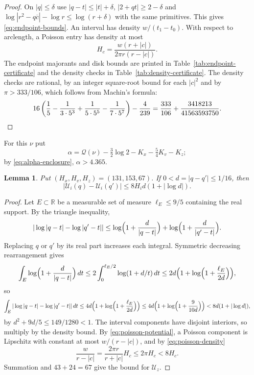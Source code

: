 \documentclass{amsart}
\newtheorem{lemma}{Lemma}[section]
\numberwithin{equation}{section}
\numberwithin{table}{section}
\begin{document}
\begin{proof}
On $|q|\le\delta$ use $|q-t|\le|t|+\delta$, $|2+qt|\ge2-\delta$ and
$\log|r^2-q\overline c|-\log r\le\log(r+\delta)$ with the same primitives.
This gives \eqref{eq:endpoint-bounds}. An interval has density
$w/(t_1-t_0)$. With respect to arclength, a Poisson entry has density at
most
\begin{equation}\label{eq:poisson-density}
H_c=\frac{w(r+|c|)}{2\pi r(r-|c|)}.
\end{equation}
The endpoint majorants and disk bounds are printed in
Table~\ref{tab:endpoint-certificate} and the density checks in
Table~\ref{tab:density-certificate}. The density checks are rational, by an integer square-root bound for
each $|c|^2$ and by $\pi>333/106$, which follows from Machin's formula:
\[
 16\left(\frac15-\frac1{3\cdot5^3}
       +\frac1{5\cdot5^5}-\frac1{7\cdot5^7}\right)-\frac4{239}
 =\frac{333}{106}+\frac{3418213}{41563593750}.\qedhere
\]
\end{proof}

For this $\nu$ put
\[
 \alpha=\mathcal Q(\nu)-\tfrac32\log2-K_x-\tfrac54K_v-K_z;
\]
by \eqref{eq:alpha-enclosure}, $\alpha>4.365$.

\begin{lemma}\label{lem:potential-modulus}
Put $(H_x,H_v,H_z)=(131,153,67)$. If $0<d=|q-q'|\le1/16$, then
\begin{equation*}
 |\mathcal U_i(q)-\mathcal U_i(q')|\le8H_i d(1+|\log d|).
\end{equation*}
\end{lemma}
\begin{proof}
Let $E\subset\mathbb R$ be a measurable set of measure $\ell_E\le9/5$ containing
the real support. By the triangle inequality,
\[
 |\log|q-t|-\log|q'-t||
 \le\log\Bigl(1+\frac d{|q-t|}\Bigr)
      +\log\Bigl(1+\frac d{|q'-t|}\Bigr).
\]
Replacing $q$ or $q'$ by its real part increases each integral. Symmetric
decreasing rearrangement gives
\[
 \int_E\log\Bigl(1+\frac d{|q-t|}\Bigr)\,dt
 \le2\int_0^{\ell_E/2}\log(1+d/t)\,dt
 \le2d\Bigl(1+\log\Bigl(1+\frac{\ell_E}{2d}\Bigr)\Bigr),
\]
so
\[
 \int_E|\log|q-t|-\log|q'-t||\,dt
 \le4d\Bigl(1+\log\Bigl(1+\frac{\ell_E}{2d}\Bigr)\Bigr)
 \le4d\Bigl(1+\log\Bigl(1+\frac9{10d}\Bigr)\Bigr)
 <8d(1+|\log d|),
\]
by $d^2+9d/5\le149/1280<1$. The interval components have disjoint
interiors, so multiply by the density bound. By
\eqref{eq:poisson-potential}, a Poisson component is Lipschitz with
constant at most $w/(r-|c|)$, and by \eqref{eq:poisson-density}
\[
 \frac{w}{r-|c|}=\frac{2\pi r}{r+|c|}H_c\le2\pi H_c<8H_c.
\]
Summation and $43+24=67$ give the bound for $\mathcal U_z$.
\end{proof}
\end{document}

